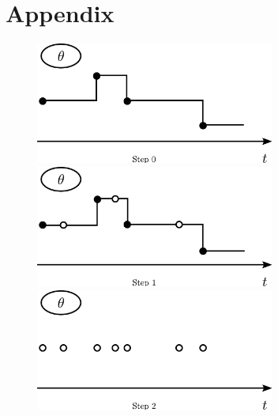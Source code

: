 \section{Appendix}

\setlength{\unitlength}{0.8cm}
  \begin{figure}[H]
  \centering
  \begin{minipage}[!hp]{0.45\linewidth}
  \centering
    \includegraphics [width=0.70\textwidth, angle=0]{figs/plotn0.pdf}
      \end{minipage}
  \begin{minipage}[!hp]{0.45\linewidth}
  \centering
    \includegraphics [width=0.70\textwidth, angle=0]{figs/plotn1.pdf}
    \vspace{-0 in}
  \end{minipage}
  \begin{minipage}[!hp]{0.45\linewidth}
  \centering
    \includegraphics [width=0.70\textwidth, angle=0]{figs/plotn2.pdf}
    \vspace{-0 in}
  \end{minipage}
  \begin{minipage}[!hp]{0.45\linewidth}

\end{minipage}
\end{figure}
